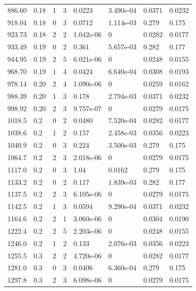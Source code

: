 \documentclass[preview]{standalone}
\begin{document}
{{{\begin{tabular}{L{1.2cm}C{1.2cm} C{0.3cm}C{0.5cm} C{1.4cm}C{1.4cm} C{1.4cm}C{1.4cm}}
  886.60  &  0.18  & 1     &  3 &  0.0223  & 3.490e-04  & 0.0371 &  0.0232   \\ 
  918.04  &  0.18  & 0     &  3 &  0.0712  & 1.114e-03  & 0.279 &  0.175   \\ 
  923.73  &  0.18  & 2     &  2 &  1.042e-06  & 0  & 0.0282 &  0.0177   \\ 
  933.49  &  0.19  & 0     &  2 &  0.361  & 5.657e-03  & 0.282 &  0.177   \\ 
  944.95  &  0.19  & 2     &  5 &  6.021e-06  & 0  & 0.0248 &  0.0155   \\ 
  968.70  &  0.19  & 1     &  4 &  0.0424  & 6.640e-04  & 0.0308 &  0.0193   \\ 
  978.14  &  0.20  & 2     &  4 &  1.090e-06  & 0  & 0.0259 &  0.0162   \\ 
  988.39  &  0.20  & 1     &  3 &  0.178  & 2.794e-03  & 0.0371 &  0.0232   \\ 
  998.92  &  0.20  & 2     &  3 &  9.757e-07  & 0  & 0.0279 &  0.0175   \\ 
  1018.5  &   0.2  & 0     &  2 &  0.0480  & 7.520e-04  & 0.0282 &  0.0177   \\ 
  1038.6  &   0.2  & 1     &  2 &  0.157  & 2.458e-03  & 0.0356 &  0.0223   \\ 
  1040.9  &   0.2  & 0     &  3 &  0.224  & 3.500e-03  & 0.279 &  0.175   \\ 
  1064.7  &   0.2  & 2     &  3 &  2.018e-06  & 0  & 0.0279 &  0.0175   \\ 
  1117.0  &   0.2  & 0     &  3 &  1.04  & 0.0162  & 0.279 &  0.175   \\ 
  1133.2  &   0.2  & 0     &  2 &  0.117  & 1.839e-03  & 0.282 &  0.177   \\ 
  1137.5  &   0.2  & 2     &  3 &  6.105e-06  & 0  & 0.0279 &  0.0175   \\ 
  1142.5  &   0.2  & 1     &  3 &  0.0594  & 9.290e-04  & 0.0371 &  0.0232   \\ 
  1164.6  &   0.2  & 2     &  1 &  3.060e-06  & 0  & 0.0304 &  0.0190   \\ 
  1222.4  &   0.2  & 2     &  5 &  2.203e-06  & 0  & 0.0248 &  0.0155   \\ 
  1246.0  &   0.2  & 1     &  2 &  0.133  & 2.076e-03  & 0.0356 &  0.0223   \\ 
  1255.5  &   0.3  & 2     &  2 &  4.720e-06  & 0  & 0.0282 &  0.0177   \\ 
  1281.0  &   0.3  & 0     &  3 &  0.0406  & 6.360e-04  & 0.279 &  0.175   \\ 
  1297.8  &   0.3  & 2     &  3 &  6.098e-06  & 0  & 0.0279 &  0.0175   \\ 

\end{tabular}}}}
\end{document}
